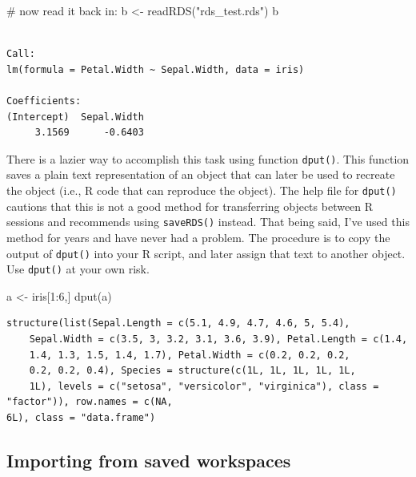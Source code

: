 \documentclass[
  13,
  letterpaper,
]{report}
\newenvironment{Shaded}{\begin{snugshade}}{\end{snugshade}}
\newcommand{\CommentTok}[1]{\textcolor[rgb]{0.37,0.37,0.37}{#1}}
\newcommand{\DecValTok}[1]{\textcolor[rgb]{0.68,0.00,0.00}{#1}}
\newcommand{\FunctionTok}[1]{\textcolor[rgb]{0.28,0.35,0.67}{#1}}
\newcommand{\NormalTok}[1]{\textcolor[rgb]{0.00,0.23,0.31}{#1}}
\newcommand{\OtherTok}[1]{\textcolor[rgb]{0.00,0.23,0.31}{#1}}
\newcommand{\SpecialCharTok}[1]{\textcolor[rgb]{0.37,0.37,0.37}{#1}}
\newcommand{\StringTok}[1]{\textcolor[rgb]{0.13,0.47,0.30}{#1}}
\begin{document}
\begin{Shaded}
\begin{Highlighting}[]
\CommentTok{\# now read it back in:}
\NormalTok{b }\OtherTok{\textless{}{-}} \FunctionTok{readRDS}\NormalTok{(}\StringTok{"rds\_test.rds"}\NormalTok{)}
\NormalTok{b}
\end{Highlighting}
\end{Shaded}

\begin{verbatim}

Call:
lm(formula = Petal.Width ~ Sepal.Width, data = iris)

Coefficients:
(Intercept)  Sepal.Width  
     3.1569      -0.6403  
\end{verbatim}

There is a lazier way to accomplish this task using function
\texttt{dput()}. This function saves a plain text representation of an
object that can later be used to recreate the object (i.e., R code that
can reproduce the object). The help file for \texttt{dput()} cautions
that this is not a good method for transferring objects between R
sessions and recommends using \texttt{saveRDS()} instead. That being
said, I've used this method for years and have never had a problem. The
procedure is to copy the output of \texttt{dput()} into your R script,
and later assign that text to another object. Use \texttt{dput()} at
your own risk.

\begin{Shaded}
\begin{Highlighting}[]
\NormalTok{a }\OtherTok{\textless{}{-}}\NormalTok{ iris[}\DecValTok{1}\SpecialCharTok{:}\DecValTok{6}\NormalTok{,]}
\FunctionTok{dput}\NormalTok{(a)}
\end{Highlighting}
\end{Shaded}

\begin{verbatim}
structure(list(Sepal.Length = c(5.1, 4.9, 4.7, 4.6, 5, 5.4), 
    Sepal.Width = c(3.5, 3, 3.2, 3.1, 3.6, 3.9), Petal.Length = c(1.4, 
    1.4, 1.3, 1.5, 1.4, 1.7), Petal.Width = c(0.2, 0.2, 0.2, 
    0.2, 0.2, 0.4), Species = structure(c(1L, 1L, 1L, 1L, 1L, 
    1L), levels = c("setosa", "versicolor", "virginica"), class = "factor")), row.names = c(NA, 
6L), class = "data.frame")
\end{verbatim}

\subsection{Importing from saved workspaces}\label{sec-ie-import-rdata}
\end{document}
